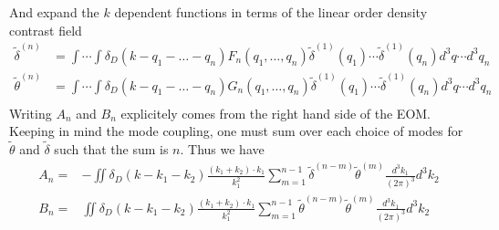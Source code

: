 And expand the $k$ dependent functions in terms of the linear order density contrast field
\begin{equation}
	\begin{split}
		\tilde\delta^{(n)} &= \int \cdots \int \delta_D(k-q_1- \dots -q_n)F_n(q_1,\dots,q_n)\tilde{\delta}^{(1)}(q_1)\cdots\tilde{\delta}^{(1)}(q_n) d^3q \cdots d^3q_n \\
		\tilde\theta^{(n)} &= \int \cdots \int \delta_D(k-q_1- \dots -q_n) G_n(q_1,\dots,q_n)\tilde{\delta}^{(1)}(q_1)\cdots\tilde{\delta}^{(1)}(q_n) d^3q \cdots d^3q_n \\
	\end{split}
\end{equation}
Writing $A_n$ and $B_n$ explicitely comes from the right hand side of the EOM. Keeping in mind the mode coupling, one must sum over each choice of modes for $\tilde{\theta}$ and $\tilde{\delta}$ such that the sum is $n$. Thus we have
\begin{equation}
 	\begin{split}
 		A_n =& -\iint \delta_D(k-k_1-k_2)\frac{(k_1+k_2)\cdot k_1}{k_1^2}\sum\limits_{m=1}^{n-1}\tilde{\delta}^{(n-m)}\tilde{\theta}^{(m)}\frac{d^3k_1}{(2\pi)^3}d^3k_2  \\
 		B_n =& \iint \delta_D(k-k_1-k_2)\frac{(k_1+k_2)\cdot k_1}{k_1^2}\sum\limits_{m=1}^{n-1}\tilde{\theta}^{(n-m)}\tilde{\theta}^{(m)}\frac{d^3k_1}{(2\pi)^3}d^3k_2  \\
 	\end{split}
\end{equation} 
